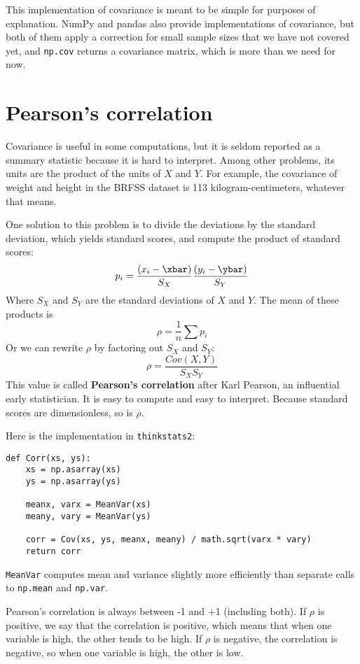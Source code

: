 \documentclass[12pt]{book}
\begin{document}
This implementation of covariance is meant to be simple for purposes
of explanation.  NumPy and pandas also provide implementations of
covariance, but both of them apply a correction for small sample sizes
that we have not covered yet, and {\tt np.cov} returns a covariance
matrix, which is more than we need for now.


\section{Pearson's correlation}

Covariance is useful in some computations, but it is seldom reported
as a summary statistic because it is hard to interpret.  Among other
problems, its units are the product of the units of $X$ and $Y$.  For
example, the covariance of weight and height in the BRFSS dataset is
113 kilogram-centimeters, whatever that means.

One solution to this problem is to divide the deviations by the standard
deviation, which yields standard scores, and compute the product of
standard scores:
%
\[ p_i = \frac{(x_i - \xbar)}{S_X} \frac{(y_i - \ybar)}{S_Y} \]
%
Where $S_X$ and $S_Y$ are the standard deviations of $X$ and $Y$.
The mean of these products is 
%
\[ \rho = \frac{1}{n} \sum p_i \]
%
Or we can rewrite $\rho$ by factoring out $S_X$ and
$S_Y$:
%
\[ \rho = \frac{Cov(X,Y)}{S_X S_Y} \]
%
This value is called {\bf Pearson's correlation} after Karl Pearson,
an influential early statistician.  It is easy to compute and easy to
interpret.  Because standard scores are dimensionless, so is $\rho$.

Here is the implementation in {\tt thinkstats2}:

\begin{verbatim}
def Corr(xs, ys):
    xs = np.asarray(xs)
    ys = np.asarray(ys)

    meanx, varx = MeanVar(xs)
    meany, vary = MeanVar(ys)

    corr = Cov(xs, ys, meanx, meany) / math.sqrt(varx * vary)
    return corr
\end{verbatim}

{\tt MeanVar} computes mean and variance slightly more efficiently
than separate calls to {\tt np.mean} and {\tt np.var}.

Pearson's correlation is always between -1 and +1 (including both).
If $\rho$ is positive, we say that the correlation is positive,
which means that when one variable is high, the other tends to be
high.  If $\rho$ is negative, the correlation is negative, so
when one variable is high, the other is low.
\end{document}
